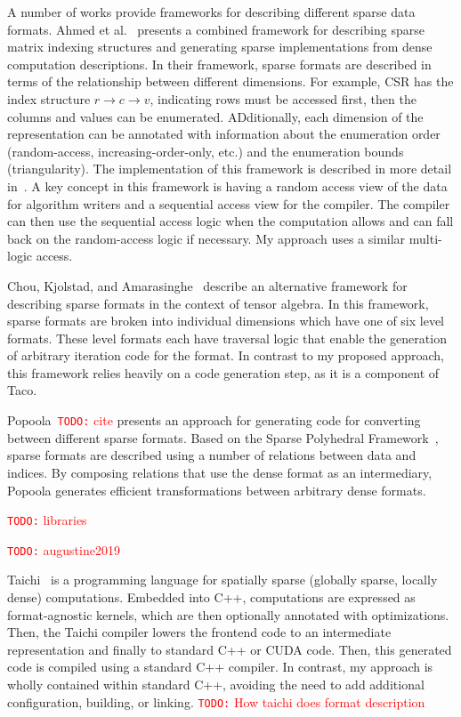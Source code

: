 \documentclass{article}
\newcommand{\todo}[1]{{\textcolor{red}{{\tt{TODO:}}\,\,#1 }}}
\newcommand{\nc}[0]{\todo{cite}}
\begin{document}
A number of works provide frameworks for describing different sparse data formats. 
Ahmed et al.~\cite{ahmed2000framework} presents a combined framework for describing sparse matrix indexing structures and generating sparse implementations from dense computation descriptions.
In their framework, sparse formats are described in terms of the relationship between different dimensions. For example, CSR has the index structure $r \rightarrow c \rightarrow v$, indicating rows must be accessed first, then the columns and values can be enumerated.
ADditionally, each dimension of the representation can be annotated with information about the enumeration order (random-access, increasing-order-only, etc.) and the enumeration bounds (triangularity).
The implementation of this framework is described in more detail in~\cite{mateev2000next}.
A key concept in this framework is having a random access view of the data for algorithm writers and a sequential access view for the compiler.
The compiler can then use the sequential access logic when the computation allows and can fall back on the random-access logic if necessary. 
My approach uses a similar multi-logic access.

Chou, Kjolstad, and Amarasinghe~\cite{chou2018format} describe an alternative framework for describing sparse formats in the context of tensor algebra. 
In this framework, sparse formats are broken into individual dimensions which have one of six level formats. 
These level formats each have traversal logic that enable the generation of arbitrary iteration code for the format.
In contrast to my proposed approach, this framework relies heavily on a code generation step, as it is a component of Taco.

Popoola~\nc presents an approach for generating code for converting between different sparse formats.
Based on the Sparse Polyhedral Framework~\cite{strout2018sparse}, sparse formats are described using a number of relations between data and indices. 
By composing relations that use the dense format as an intermediary, Popoola generates efficient transformations between arbitrary dense formats.


\todo{libraries}




\todo{augustine2019}



Taichi~\cite{hu2019taichi} is a programming language for spatially sparse (globally sparse, locally dense) computations.
Embedded into C++, computations are expressed as format-agnostic kernels, which are then optionally annotated with optimizations.
Then, the Taichi compiler lowers the frontend code to an intermediate representation and finally to standard C++ or CUDA code. 
Then, this generated code is compiled using a standard C++ compiler.
In contrast, my approach is wholly contained within standard C++, avoiding the need to add additional configuration, building, or linking.
\todo{How taichi does format description}
\end{document}
